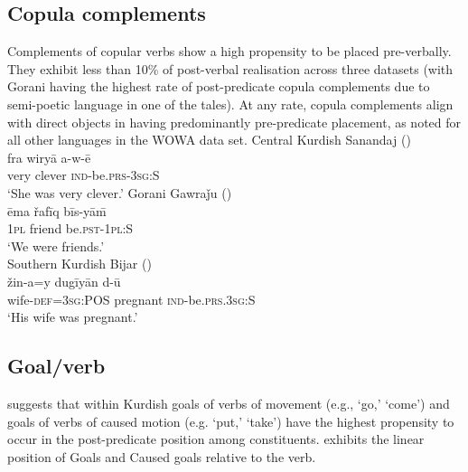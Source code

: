 \documentclass[output=paper,colorlinks,citecolor=brown]{langscibook}
\begin{document}
\begin{sloppypar}
\subsection{Copula complements}
Complements of copular verbs show a high propensity to be placed pre-verbally. They exhibit less than 10\% of post-verbal realisation across three datasets (with Gorani having the highest rate of post-predicate copula complements due to semi-poetic language in one of the tales). At any rate, copula complements align with direct objects in having predominantly pre-predicate placement, as noted for all other  languages in the WOWA data set.
\ea
\ea\label{MGKC:ex:12a}
Central Kurdish Sanandaj (\citealt[B, 0543]{mohammadirad_Sanandaj_Kurdish_2022}) \\
\gll fra wiryā a-w-ē \\
very clever \textsc{ind}-be.\textsc{prs-3sg:S} \\
\glt `She was very clever.'
\ex\label{MGKC:ex:12b}
Gorani Gawraǰu (\citealt[C, 0524]{mohammadirad_gorani_2022}) \\
\gll ēma řafīq bīs-yām̄ \\
\textsc{1pl} friend be.\textsc{pst-1pl:S} \\
\glt `We were friends.' \\
\ex\label{MGKC:ex:12c}
Southern Kurdish Bijar (\citealt[D, 0278]{mohammadirad_Bijar_Kurdish_2022}) \\
\gll žin-a=y dugīyān d-\=u \\
wife-\textsc{def=3sg:POS} pregnant \textsc{ind}-be.\textsc{prs.3sg:S} \\
\glt `His wife was pregnant.'
\z
\z 

\subsection{Goal/verb} \label{MGKC_goal}
\citet{haig_verb-goal_2015,Haig2022PostPredicateCon} suggests that within Kurdish goals of verbs of movement (e.g., `go,' `come') and goals of verbs of caused motion (e.g. `put,' `take') have the highest propensity to occur in the post-predicate position among  constituents.  exhibits the linear position of Goals and Caused goals relative to the verb.


\end{sloppypar}
\end{document}
